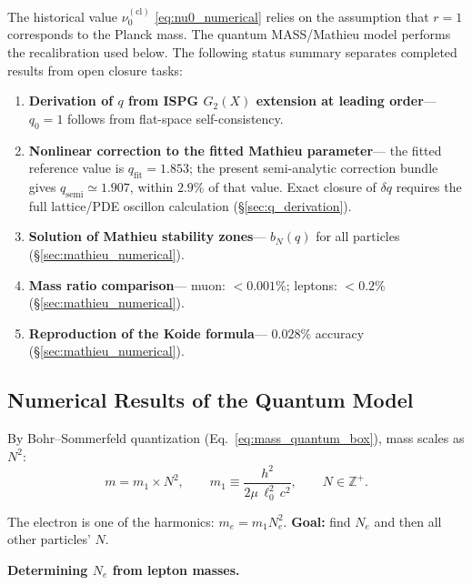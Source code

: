 \documentclass[11pt]{article}
\begin{document}
The historical value $\nu_0^{(\mathrm{cl})}$
\eqref{eq:nu0_numerical} relies on the assumption that
$r = 1$ corresponds to the Planck mass. The quantum
MASS/Mathieu model performs the recalibration used below.
The following status summary separates completed results from
open closure tasks:
\begin{enumerate}
  \item[\checkmark] \textbf{Derivation of $q$ from ISPG
    $G_2(X)$ extension at leading order}---
    $q_0 = 1$ follows from flat-space self-consistency.
  \item[$\circ$] \textbf{Nonlinear correction to the fitted
    Mathieu parameter}---
    the fitted reference value is
    $q_{\mathrm{fit}} = 1.853$; the present semi-analytic
    correction bundle gives $q_{\mathrm{semi}}\simeq 1.907$,
    within $2.9\%$ of that value. Exact closure of
    $\delta q$ requires the full lattice/PDE oscillon
    calculation (\S\ref{sec:q_derivation}).
  \item[\checkmark] \textbf{Solution of Mathieu stability
    zones}---
    $b_N(q)$ for all particles
    (\S\ref{sec:mathieu_numerical}).
  \item[\checkmark] \textbf{Mass ratio comparison}---
    muon: $< 0.001\%$; leptons: $< 0.2\%$
    (\S\ref{sec:mathieu_numerical}).
  \item[\checkmark] \textbf{Reproduction of the Koide
    formula}---
    $0.028\%$ accuracy
    (\S\ref{sec:mathieu_numerical}).
\end{enumerate}

\subsection{Numerical Results of the Quantum Model}
\label{sec:numerical_results}

By Bohr--Sommerfeld quantization
(Eq.~\ref{eq:mass_quantum_box}), mass scales as $N^2$:
\begin{equation}
  m = m_1 \times N^2,
  \qquad m_1 \equiv \frac{h^2}{2\mu\,\ell_0^2\,c^2},
  \qquad N \in \mathbb{Z}^{+}.
  \label{eq:mass_N_squared}
\end{equation}

The electron is one of the harmonics: $m_e = m_1 N_e^2$.
\textbf{Goal:} find $N_e$ and then all other particles' $N$.

\medskip
\textbf{Determining $N_e$ from lepton masses.}
\end{document}
